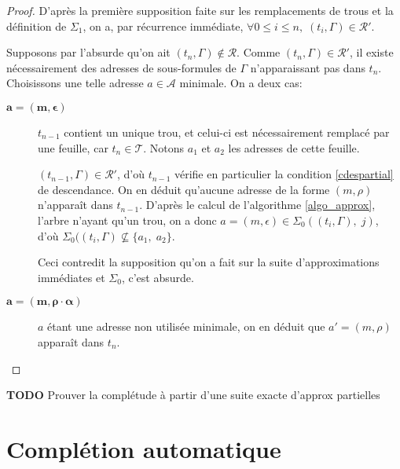 \documentclass[11pt,a4paper]{article}
\theoremstyle{plain}
\theoremstyle{definition}
\theoremstyle{remark}
\newcommand*{\someadd}{\rho}
\newcommand*{\sequent}{\Gamma}
\newcommand*{\addresses}{\ensuremath{\mathcal{A}}}
\newcommand*{\trees}{\ensuremath{\mathcal{T}}}
\newcommand*{\representations}{\ensuremath{\mathcal{R}}}
\newcommand*{\representationspartial}{\ensuremath{\mathcal{R'}}}
\newcommand*{\lowapprox}{\ensuremath{\Sigma_0}}
\newcommand*{\highapprox}{\ensuremath{\Sigma_1}}
\newcommand*{\todo}{{\normalfont \textbf{TODO}} }
\begin{document}
\begin{proof}
    D'après la première supposition faite sur les remplacements de trous et la définition de $\highapprox$, on a, par récurrence immédiate, $\forall 0 \leq i \leq n, \; (t_i, \sequent) \in \representationspartial$.

    Supposons par l'absurde qu'on ait $(t_n, \sequent) \notin \representations$. Comme $(t_n, \sequent) \in \representationspartial$, il existe nécessairement des adresses de sous-formules de $\sequent$ n'apparaissant pas dans $t_n$. Choisissons une telle adresse $a \in \addresses$ minimale. On a deux cas:

    \begin{description}
        \item[$\bm{a = (m, \epsilon)}$] $t_{n-1}$ contient un unique trou, et celui-ci est nécessairement remplacé par une feuille, car $t_n \in \trees$. Notons $a_1$ et $a_2$ les adresses de cette feuille.
        
        $(t_{n-1}, \Gamma) \in \representationspartial$, d'où $t_{n-1}$ vérifie en particulier la condition \ref{cdespartial} de descendance. On en déduit qu'aucune adresse de la forme $(m, \someadd)$ n'apparaît dans $t_{n-1}$. D'après le calcul de l'algorithme \ref{algo_approx}, l'arbre n'ayant qu'un trou, on a donc $a = (m, \epsilon) \in \lowapprox((t_i, \sequent), \; j)$, d'où $\lowapprox((t_i, \sequent) \nsubseteq \{a_1, \; a_2\}$. 
        
        Ceci contredit la supposition qu'on a fait sur la suite d'approximations immédiates et $\lowapprox$, c'est absurde.

        \item[$\bm{a = (m, \someadd \cdot \alpha)}$] $a$ étant une adresse non utilisée minimale, on en déduit que $a' = (m, \someadd)$ apparaît dans $t_n$.
    \end{description}
\end{proof}

\todo{Prouver la complétude à partir d'une suite exacte d'approx partielles}

\section{Complétion automatique}
\end{document}
